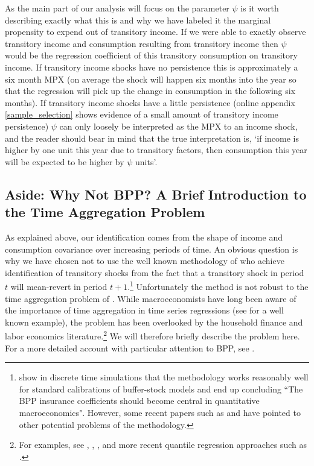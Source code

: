 \documentclass[titlepage]{\econtex}\newcommand{\texname}{ConsumptionHeterogeneity}
\begin{document}
As the main part of our analysis will focus on the parameter $\psi$ is it worth describing exactly what this is and why we have labeled it the marginal propensity to expend out of transitory income. If we were able to exactly observe transitory income and consumption resulting from transitory income then $\psi$ would be the regression coefficient of this transitory consumption on transitory income. If transitory income shocks have no persistence this is approximately a six month MPX (on average the shock will happen six months into the year so that the regression will pick up the change in consumption in the following six months). If transitory income shocks have a little persistence (online appendix \ref{sample_selection} shows evidence of a small amount of transitory income persistence) $\psi$ can only loosely be interpreted as the MPX to an income shock, and the reader should bear in mind that the true interpretation is, `if income is higher by one unit this year due to transitory factors, then consumption this year will be expected to be higher by $\psi$ units'.

\subsection{Aside: Why Not BPP? A Brief Introduction to the Time Aggregation Problem} \label{TimeAgg}
As explained above, our identification comes from the shape of income and consumption covariance over increasing periods of time. An obvious question is why we have chosen not to use the well known methodology of \cite{blundell_consumption_2008} who achieve identification of transitory shocks from the fact that a transitory shock in period $t$ will mean-revert in period $t+1$.\footnote{\cite{kaplan_how_2010} show in discrete time simulations that the methodology works reasonably well for standard calibrations of buffer-stock models and end up concluding ``The BPP insurance coefficients should become central in quantitative macroeconomics". However, some recent papers such as \cite{commault_how_2017} and \cite{hryshko_income_2018} have pointed to other potential problems of the methodology.} Unfortunately the method is not robust to the time aggregation problem of \cite{working_note_1960}. While macroeconomists have long been aware of the importance of time aggregation in time series regressions (see \cite{campbell_consumption_1989} for a well known example), the problem has been overlooked by the household finance and labor economics literature.\footnote{For examples, see \cite{moffitt_trends_2012}, \cite{meghir_income_2004}, \cite{nielsen_impact_2004}, \cite{heathcote_unequal_2010} and more recent quantile regression approaches such as \cite{arellano_earnings_2017}.} We will therefore briefly describe the problem here. For a more detailed account with particular attention to BPP, see \cite{crawley_time_2018}.
\end{document}
